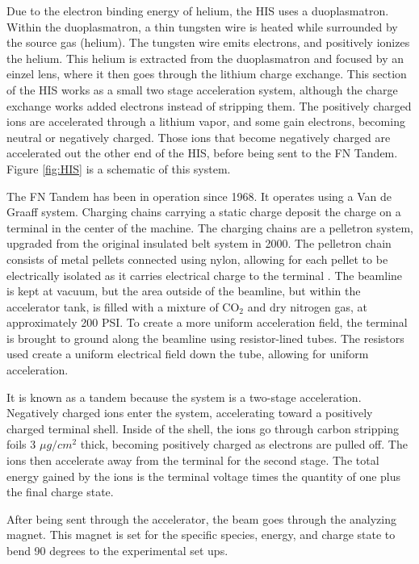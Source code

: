 Due to the electron binding energy of helium, the HIS uses a duoplasmatron. Within the duoplasmatron, a thin tungsten wire is heated while surrounded by the source gas (helium). The tungsten wire emits electrons, and positively ionizes the helium. This helium is extracted from the duoplasmatron and focused by an einzel lens, where it then goes through the lithium charge exchange. This section of the HIS works as a small two stage acceleration system, although the charge exchange works added electrons instead of stripping them. The positively charged ions are accelerated through a lithium vapor, and some gain electrons, becoming neutral or negatively charged. Those ions that become negatively charged are accelerated out the other end of the HIS, before being sent to the FN Tandem. Figure \ref{fig:HIS} is a schematic of this system.



The FN Tandem has been in operation since 1968. It operates using a Van de Graaff system. Charging chains carrying a static charge deposit the charge on a terminal in the center of the machine. The charging chains are a pelletron system, upgraded from the original insulated belt system in 2000. The pelletron chain consists of metal pellets connected using nylon, allowing for each pellet to be electrically isolated as it carries electrical charge to the terminal \citep{nec:_pelletron}. The beamline is kept at vacuum, but the area outside of the beamline, but within the accelerator tank, is filled with a mixture of CO$_2$ and dry nitrogen gas, at approximately 200 PSI. To create a more uniform acceleration field, the terminal is brought to ground along the beamline using resistor-lined tubes. The resistors used create a uniform electrical field down the tube, allowing for uniform acceleration.

It is known as a tandem because the system is a two-stage acceleration. Negatively charged ions enter the system, accelerating toward a positively charged terminal shell. Inside of the shell, the ions go through carbon stripping foils 3 $\mu g/cm^2$ thick, becoming positively charged as electrons are pulled off. The ions then accelerate away from the terminal for the second stage. The total energy gained by the ions is the terminal voltage times the quantity of one plus the final charge state.



After being sent through the accelerator, the beam goes through the analyzing magnet. This magnet is set for the specific species, energy, and charge state to bend 90 degrees to the experimental set ups.

